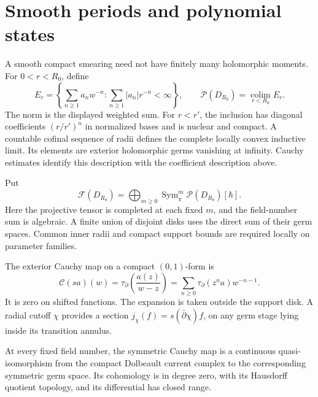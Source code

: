 \section{Smooth periods and polynomial states}

A smooth compact smearing need not have finitely many holomorphic moments.
For \(0<r<R_0\), define
\[
 E_r=\left\{\sum_{n\geq1}a_nw^{-n}:
                       \sum_{n\geq1}|a_n|r^{-n}<\infty\right\},
 \qquad \mathscr P(D_{R_0})=\operatorname*{colim}_{r<R_0}E_r.
\]
The norm is the displayed weighted sum. For \(r<r'\), the inclusion has
diagonal coefficients \((r/r')^n\) in normalized bases and is nuclear
and compact. A countable cofinal sequence of radii defines the complete
locally convex inductive limit. Its elements are exterior holomorphic
germs vanishing at infinity. Cauchy estimates identify this description
with the coefficient description above.

Put
\[
 \mathscr F(D_{R_0})=
       \bigoplus_{m\geq0}\operatorname{Sym}_\pi^m\mathscr P(D_{R_0})[\hbar].
\]
Here the projective tensor is completed at each fixed \(m\), and the
field-number sum is algebraic. A finite union of disjoint disks uses the
direct sum of their germ spaces. Common inner radii and compact support
bounds are required locally on parameter families.

The exterior Cauchy map on a compact \((0,1)\)-form is
\begin{equation}\label{eq:vol2-native-cauchy}
 \mathcal C(sa)(w)=\tau_\partial\left(\frac{a(z)}{w-z}\right)
             =\sum_{n\geq0}\tau_\partial(z^na)w^{-n-1}.
\end{equation}
It is zero on shifted functions. The expansion is taken outside the
support disk. A radial cutoff \(\chi\) provides a section
\(j_\chi(f)=s(\bar\partial\chi)f\), on any germ stage lying inside its
transition annulus.

\begin{lemma}\label{lem:vol2-native-dolbeault}
At every fixed field number, the symmetric Cauchy map is a continuous
quasi-isomorphism from the compact Dolbeault current complex to the
corresponding symmetric germ space. Its cohomology is in degree zero,
with its Hausdorff quotient topology, and its differential has closed
range.
\end{lemma}

